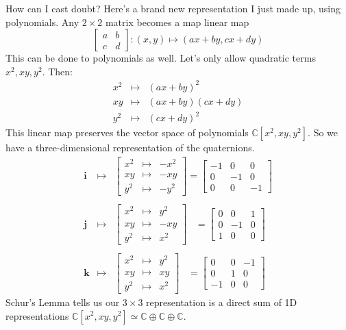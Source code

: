 \documentclass[12pt]{article}
\newcommand{\ii}{\mathbf{i}}
\newcommand{\jj}{\mathbf{j}}
\newcommand{\kk}{\mathbf{k}}
\begin{document}
How can I cast doubt?  Here's a brand new representation I just made up, using polynomials.  Any $2 \times 2$ matrix becomes a map linear map
$$ 
 \left[ \begin{array}{cc} a & b \\ c & d \end{array} \right] : (x,y) \mapsto (ax+by, cx+dy)  $$ 
This can be done to polynomials as well.  Let's only allow quadratic terms $x^2, xy, y^2$.  Then:
\begin{eqnarray*}
x^2 &\mapsto& (ax+by)^2 \\
xy  &\mapsto& (ax+by)(cx+dy) \\
y^2 &\mapsto& (cx+dy)^2
\end{eqnarray*}
This linear map preserves the vector space of polynomials $\mathbb{C}[x^2, xy, y^2]$.  So we have a three-dimensional representation of the quaternions.
\begin{eqnarray*} \ii &\mapsto& 
\left[\begin{array}{ccc}
x^2 &\mapsto& -x^2 \\
xy  &\mapsto& -xy \\
y^2 &\mapsto& -y^2
\end{array}\right] = \left[ \begin{array}{rrr} -1 & 0 & 0 \\ 0 & -1 & 0 \\ 0 & 0 & -1\end{array}\right] \\ \\
\jj &\mapsto& 
\left[\begin{array}{ccc}
x^2 &\mapsto& y^2 \\
xy  &\mapsto& -xy \\
y^2 &\mapsto& x^2
\end{array}\right] \;\;\; = \left[ \begin{array}{rrr} 0 & 0 & 1 \\ 0 & -1 & 0 \\ 1 & 0 & 0\end{array}\right] \\ \\
\kk &\mapsto& 
\left[\begin{array}{ccc}
x^2 &\mapsto& y^2 \\
xy  &\mapsto& xy \\
y^2 &\mapsto& x^2
\end{array}\right] \;\;\; = \left[ \begin{array}{rrr} 0 & 0 & -1 \\ 0 & 1 & 0 \\ -1 & 0 & 0\end{array}\right]
\end{eqnarray*} 
Schur's Lemma tells us our $3 \times 3$ representation is a direct sum of 1D representations $\mathbb{C}[x^2, xy, y^2] \simeq \mathbb{C} \oplus \mathbb{C} \oplus  \mathbb{C}$.
\end{document}
